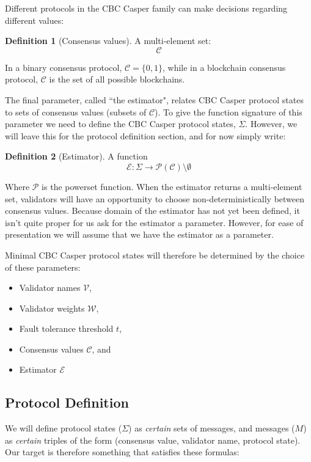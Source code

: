 \documentclass{article}
\theoremstyle{definition}
\newtheorem{defn}{Definition}[section]
\begin{document}
Different protocols in the CBC Casper family can make decisions regarding different values:

\begin{defn}[Consensus values]
A multi-element set:
$$
\mathcal{C}
$$
\end{defn}

In a binary consensus protocol, $\mathcal{C} = \{0,1\}$, while in a blockchain consensus protocol, $\mathcal{C}$ is the set of all possible blockchains.

The final parameter, called ``the estimator", relates CBC Casper protocol states to sets of consensus values (subsets of $\mathcal{C}$). To give the function signature of this parameter we need to define the CBC Casper protocol states, $\Sigma$. However, we will leave this for the protocol definition section, and for now simply write:

\begin{defn}[Estimator]
A function
$$
\mathcal{E}: \Sigma \to \mathcal{P}(\mathcal{C})\setminus\emptyset
$$
\end{defn}

Where $\mathcal{P}$ is the powerset function. When the estimator returns a multi-element set, validators will have an opportunity to choose non-deterministically between consensus values. Because domain of the estimator has not yet been defined, it isn't quite proper for us ask for the estimator a parameter. However, for ease of presentation we will assume that we have the estimator as a parameter.

Minimal CBC Casper protocol states will therefore be determined by the choice of these parameters:

\begin{itemize}
\item Validator names $\mathcal{V}$,
\item Validator weights $\mathcal{W}$,
\item Fault tolerance threshold $t$,
\item Consensus values $\mathcal{C}$, and
\item Estimator $\mathcal{E}$
\end{itemize}

\pagebreak
\subsection{Protocol Definition}

We will define protocol states ($\Sigma$) as \emph{certain} sets of messages, and messages ($M$) as \emph{certain} triples of the form (consensus value, validator name, protocol state). Our target is therefore something that satisfies these formulas:
\end{document}
